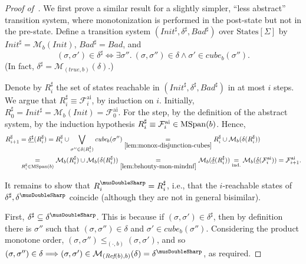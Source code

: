 \documentclass[acmsmall,screen]{acmart}
\renewcommand{\implies}{\Longrightarrow}
\newcommand{\true}{{\textit{true}}}
\newcommand{\vocabulary}{\Sigma}
\newcommand{\voc}{\vocabulary}
\newcommand{\Init}{{\textit{Init}}}
\newcommand{\Bad}{\textit{Bad}}
\newcommand{\States}{{\mbox{States}}[\voc]}
\newcommand{\tr}{\delta}
\newcommand{\Frameai}{\mathcal{F}^{\text{ai}}}
\newcommand{\reflextr}[1]{\underline{#1}}
\newcommand{\postimage}[2]{{\reflextr{#1}}({#2})}
\newcommand{\cubemon}[2]{\textit{cube}_{{#2}}({#1})}
\newcommand{\moncube}[2]{\cubemon{#1}{#2}}
\newcommand{\monox}[2]{\mathcal{M}_{#2}({#1})}
\newcommand{\mspan}[1]{{\rm MSpan}({#1})}
\newcommand{\abs}[1]{{#1}^{\sharp}}
\newcommand{\absr}[1]{{#1}^{\musDoubleSharp}}
\newcommand{\bkcube}{b}
\newcommand{\reflect}[1]{\textit{Ref}({#1})}
\begin{document}
%
\begin{proof}[Proof of~]
We first prove a similar result for a slightly simpler, ``less abstract'' transition system, where monotonization is performed in the post-state but not in the pre-state.
Define a transition system $(\abs{\Init},\abs{\tr},\abs{\Bad})$ over $\States$ by $\abs{\Init} = \monox{\Init}{\bkcube}$, $\abs{Bad} = \Bad$, and
\begin{equation*}
	(\sigma,\sigma') \in \abs{\tr} \iff \exists \sigma''. \ (\sigma,\sigma'') \in \tr \land \sigma' \in \cubemon{\sigma''}{\bkcube}.
\end{equation*}
(In fact, $\abs{\tr}=\monox{\tr}{(\true,\bkcube)}$.)

Denote by $\abs{R}_i$ the set of states reachable in $(\abs{\Init},\abs{\tr},\abs{Bad})$ in at most $i$ steps.
We argue that $\abs{R}_i \equiv \Frameai_{i}$,
by induction on $i$.
Initially, $\abs{R}_0 = \abs{\Init} = \monox{\Init}{\bkcube} = \Frameai_0$.
For the step, by the definition of the abstract system, by the induction hypothesis $\abs{R}_i \equiv \Frameai_i \in \mspan{\bkcube}$. Hence,
\begin{align*}
	\abs{R}_{i+1} &= \postimage{\abs{\tr}}{\abs{R}_i}
	= \abs{R}_i \cup \bigvee_{\sigma'' \in \tr({\abs{R}_i})}{\cubemon{\sigma''}{\bkcube}}
	\underset{\rm \Cref{lem:monox-disjunction-cubes}}{=}
	\abs{R}_i \cup \monox{{\tr}({\abs{R}_i})}{\bkcube}
	\\
	&\underset{\abs{R}_i \in \mspan{\bkcube}}{=}
	\monox{\abs{R}_i}{\bkcube} \cup \monox{{\tr}({\abs{R}_i})}{\bkcube}
	\underset{\rm \Cref{lem:bshouty-mon-mindnf}}{=}
	\monox{\postimage{\tr}{\abs{R}_i}}{\bkcube}
	\underset{\rm ind.}{=}
	\monox{\postimage{\tr}{\Frameai_i}}{\bkcube}
	= \Frameai_{i+1}.
\end{align*} %

It remains to show that $\absr{R}_i = \abs{R}_i$, i.e., that the $i$-reachable states of $\abs{\tr},\absr{\tr}$ coincide (although they are not in general bisimilar).

First, $\abs{\tr} \subseteq \absr{\tr}$. This is because if $(\sigma,\sigma') \in \abs{\tr}$, then by definition there is $\sigma''$ such that $(\sigma,\sigma'') \in \tr$ and $\sigma' \in \moncube{\sigma''}{\bkcube}$. Considering the product monotone order, $(\sigma,\sigma'') \leq_{(\cdot,\bkcube)} (\sigma,\sigma')$,
%
and so $(\sigma,\sigma'') \in \tr \implies (\sigma,\sigma') \in \monox{\tr}{(\reflect{\bkcube},\bkcube)} = \absr{\tr}$, as required.


\end{proof}
\end{document}
